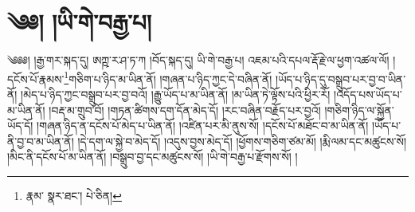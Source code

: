 \setcounter{footnote}{0} 
\chapter{༄༅། །ཡི་གེ་བརྒྱ་པ།}༄༅༅། །རྒྱ་གར་སྐད་དུ། ཨཀྵ་ར་ཤ་ཏ་ཀ །བོད་སྐད་དུ། ཡི་གེ་བརྒྱ་པ། འཇམ་པའི་དཔལ་རྡོ་རྗེ་ལ་ཕྱག་འཚལ་ལོ། །དངོས་པོ་རྣམས་\footnote{རྣམ་  སྣར་ཐང་།  པེ་ཅིན། }གཅིག་པ་ཉིད་མ་ཡིན་ནོ། །གཞན་པ་ཉིད་ཀྱང་དེ་བཞིན་ནོ། །ཡོད་པ་ཉིད་དུ་བསྒྲུབ་པར་བྱ་བ་ཡིན་ནོ། །མེད་པ་ཉིད་ཀྱང་བསྒྲུབ་པར་བྱ་བའོ། །རྒྱུ་ཡོད་པ་མ་ཡིན་ནོ། །མ་ཡིན་ཏེ་ལྟོས་པའི་ཕྱིར་རོ། །འདོད་པས་ཡོད་པ་མ་ཡིན་ནོ། །བརྡ་མ་གྲུབ་བོ། །གཏན་ཚིགས་དག་དོན་མེད་དོ། །རང་བཞིན་བརྗོད་པར་བྱའོ། །གཅིག་ཉིད་ལ་སྐྱོན་ཡོད་དོ། །གཞན་ཉིད་ན་དངོས་པོ་མེད་པ་ཡིན་ནོ། །འཛིན་པར་མི་ནུས་སོ། །དངོས་པོ་མཐོང་བ་མ་ཡིན་ནོ། །ཡོད་པ་ནི་བྱ་བ་མ་ཡིན་ནོ། །དེ་དག་ལ་སྐྱེ་བ་མེད་དོ། །འདུས་བྱས་མེད་དོ། །ཕྱོགས་གཅིག་ཙམ་མོ། །རྨི་ལམ་དང་མཚུངས་སོ། །མིང་ནི་དངོས་པོ་མ་ཡིན་ནོ། །བསྒྲུབ་བྱ་དང་མཚུངས་སོ། །ཡི་གེ་བརྒྱ་པ་རྫོགས་སོ། ། 